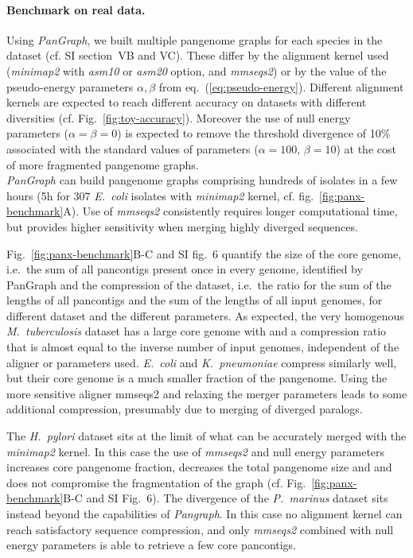 \documentclass[aps,rmp,preprint,superscriptaddress,10pt,linenumbers]{revtex4-1}
\newcommand{\SIdataBenchmark}{V}
\newcommand{\SIfigBenchmark}{6}
\begin{document}
\paragraph*{Benchmark on real data.}
Using \textit{PanGraph}, we built multiple pangenome graphs for each species in the dataset (cf. SI section~{\SIdataBenchmark}B and {\SIdataBenchmark}C). These differ by the alignment kernel used (\textit{minimap2} with \textit{asm10} or \textit{asm20} option, and \textit{mmseqs2}) or by the value of the pseudo-energy parameters $\alpha,\beta$ from eq.~(\ref{eq:pseudo-energy}).
Different alignment kernels are expected to reach different accuracy on datasets with different diversities (cf. Fig.~\ref{fig:toy-accuracy}). Moreover the use of null energy parameters ($\alpha = \beta = 0$) is expected to remove the threshold divergence of 10\% associated with the standard values of parameters ($\alpha=100$, $\beta=10$) at the cost of more fragmented pangenome graphs.\\
\textit{PanGraph} can build pangenome graphs comprising hundreds of isolates in a few hours (5h for 307 \textit{E.~coli} isolates with \textit{minimap2} kernel, cf. fig.~\ref{fig:panx-benchmark}A).
Use of \textit{mmseqs2} consistently requires longer computational time, but provides higher sensitivity when merging highly diverged sequences.

Fig.~\ref{fig:panx-benchmark}B-C and SI fig.~{\SIfigBenchmark} quantify the size of the core genome, i.e.~the sum of all pancontigs present once in every genome, identified by PanGraph and the compression of the dataset, i.e.~the ratio for the sum of the lengths of all pancontigs and the sum of the lengths of all input genomes, for different dataset and the different parameters.
As expected, the very homogenous \textit{M.~tuberculosis} dataset has a large core genome with and a compression ratio that is almost equal to the inverse number of input genomes, independent of the aligner or parameters used.
\textit{E.~coli} and \textit{K.~pneumoniae} compress similarly well, but their core genome is a much smaller fraction of the pangenome.
Using the more sensitive aligner mmseqs2 and relaxing the merger parameters leads to some additional compression, presumably due to merging of diverged paralogs.

The \textit{H.~pylori}  dataset sits at the limit of what can be accurately merged with the \textit{minimap2} kernel.
In this case the use of \textit{mmseqs2} and null energy parameters increases core pangenome fraction, decreases the total pangenome size and and does not compromise the fragmentation of the graph (cf. Fig.~\ref{fig:panx-benchmark}B-C and SI Fig.~{\SIfigBenchmark}).
The divergence of the \textit{P.~marinus} dataset sits instead beyond the capabilities of \textit{Pangraph}. In this case no alignment kernel can reach satisfactory sequence compression, and only \textit{mmseqs2} combined with null energy parameters is able to retrieve a few core pancontigs.\\
\end{document}
